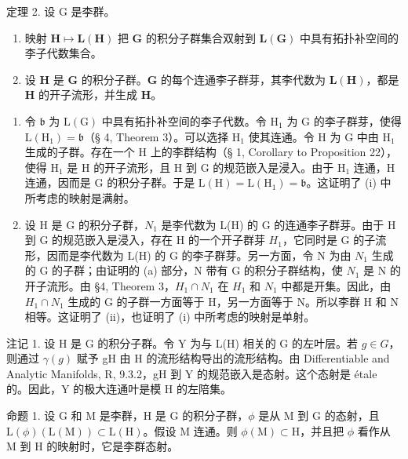 定理 2. 设 G 是李群。

\begin{enumerate}
\def\labelenumi{(\roman{enumi})}
\item
  映射 \(\mathbf{H} \mapsto \mathbf{L}(\mathbf{H})\) 把 \(\mathbf{G}\) 的积分子群集合双射到 \(\mathbf{L}(\mathbf{G})\) 中具有拓扑补空间的李子代数集合。
\item
  设 \(\mathbf{H}\) 是 \(\mathbf{G}\) 的积分子群。\(\mathbf{G}\) 的每个连通李子群芽，其李代数为 \(\mathbf{L}(\mathbf{H})\)，都是 \(\mathbf{H}\) 的开子流形，并生成 \(\mathbf{H}\)。
\end{enumerate}

\begin{enumerate}
\def\labelenumi{(\alph{enumi})}
\item
  令 \(\mathfrak{b}\) 为 \(\mathrm{L}(\mathrm{G})\) 中具有拓扑补空间的李子代数。令 \(\mathrm{H}_{1}\) 为 \(\mathrm{G}\) 的李子群芽，使得 \(\mathrm{L}(\mathrm{H}_{1}) = \mathfrak{b}\)（§ 4, Theorem 3）。可以选择 \(\mathrm{H}_{1}\) 使其连通。令 \(\mathrm{H}\) 为 \(\mathrm{G}\) 中由 \(\mathrm{H}_{1}\) 生成的子群。存在一个 \(\mathrm{H}\) 上的李群结构（§ 1, Corollary to Proposition 22），使得 \(\mathrm{H}_{1}\) 是 \(\mathrm{H}\) 的开子流形，且 \(\mathrm{H}\) 到 \(\mathrm{G}\) 的规范嵌入是浸入。由于 \(\mathrm{H}_{1}\) 连通，\(\mathrm{H}\) 连通，因而是 \(\mathrm{G}\) 的积分子群。于是 \(\mathrm{L}(\mathrm{H}) = \mathrm{L}(\mathrm{H}_{1}) = \mathfrak{b}\)。这证明了 (i) 中所考虑的映射是满射。
\item
  设 H 是 G 的积分子群，\(N_{1}\) 是李代数为 L(H) 的 G 的连通李子群芽。由于 H 到 G 的规范嵌入是浸入，存在 H 的一个开子群芽 \(H_{1}\)，它同时是 G 的子流形，因而是李代数为 L(H) 的 G 的李子群芽。另一方面，令 N 为由 \(N_{1}\) 生成的 G 的子群；由证明的 (a) 部分，N 带有 G 的积分子群结构，使 \(N_{1}\) 是 N 的开子流形。由 §4, Theorem 3，\(H_{1} \cap N_{1}\) 在 \(H_{1}\) 和 \(N_{1}\) 中都是开集。因此，由 \(H_{1} \cap N_{1}\) 生成的 G 的子群一方面等于 H，另一方面等于 N。所以李群 H 和 N 相等。这证明了 (ii)，也证明了 (i) 中所考虑的映射是单射。
\end{enumerate}

注记 1. 设 H 是 G 的积分子群。令 Y 为与 L(H) 相关的 G 的左叶层。若 \(g \in G\)，则通过 \(\gamma(g)\) 赋予 gH 由 H 的流形结构导出的流形结构。由 Differentiable and Analytic Manifolds, R, 9.3.2，gH 到 Y 的规范嵌入是态射。这个态射是 étale 的。因此，Y 的极大连通叶是模 H 的左陪集。

命题 1. 设 G 和 M 是李群，H 是 G 的积分子群，\(\phi\) 是从 M 到 G 的态射，且 \(\mathrm{L}(\phi)(\mathrm{L}(\mathrm{M})) \subset \mathrm{L}(\mathrm{H})\)。假设 M 连通。则 \(\phi(\mathrm{M}) \subset \mathrm{H}\)，并且把 \(\phi\) 看作从 M 到 H 的映射时，它是李群态射。

